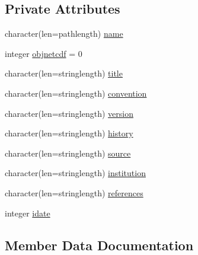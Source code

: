\subsection*{Private Attributes}
\begin{DoxyCompactItemize}
\item 
character(len=pathlength) \mbox{\hyperlink{structmodulenetcdfcf__2__hdf5mohid_1_1t__netcdf__out_a8d192c3bf08e7be0cede71e94f6931a3}{name}}
\item 
integer \mbox{\hyperlink{structmodulenetcdfcf__2__hdf5mohid_1_1t__netcdf__out_ae237abe057034aac902ceac71027f954}{objnetcdf}} = 0
\item 
character(len=stringlength) \mbox{\hyperlink{structmodulenetcdfcf__2__hdf5mohid_1_1t__netcdf__out_a0674cc5081a4f84f7eb098823160af43}{title}}
\item 
character(len=stringlength) \mbox{\hyperlink{structmodulenetcdfcf__2__hdf5mohid_1_1t__netcdf__out_a2459ca3cc93932abdec8e5ed665c8fb3}{convention}}
\item 
character(len=stringlength) \mbox{\hyperlink{structmodulenetcdfcf__2__hdf5mohid_1_1t__netcdf__out_a9f59a4e8be004183a2cedc4206808e0c}{version}}
\item 
character(len=stringlength) \mbox{\hyperlink{structmodulenetcdfcf__2__hdf5mohid_1_1t__netcdf__out_aaf05ef4d0a5734285086b43b8f4755b4}{history}}
\item 
character(len=stringlength) \mbox{\hyperlink{structmodulenetcdfcf__2__hdf5mohid_1_1t__netcdf__out_af352587775d2a3439e998c173b1a6876}{source}}
\item 
character(len=stringlength) \mbox{\hyperlink{structmodulenetcdfcf__2__hdf5mohid_1_1t__netcdf__out_aac1686bffdae94412ff72e10a96f19c6}{institution}}
\item 
character(len=stringlength) \mbox{\hyperlink{structmodulenetcdfcf__2__hdf5mohid_1_1t__netcdf__out_a61356ad69e10268425cb966293f95689}{references}}
\item 
integer \mbox{\hyperlink{structmodulenetcdfcf__2__hdf5mohid_1_1t__netcdf__out_a5e756c84b57c9f7119e51a79e7d0b7d8}{idate}}
\end{DoxyCompactItemize}


\subsection{Member Data Documentation}
\mbox{\label{structmodulenetcdfcf__2__hdf5mohid_1_1t__netcdf__out_a2459ca3cc93932abdec8e5ed665c8fb3}} 
